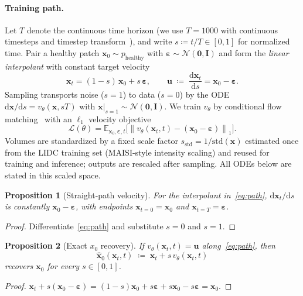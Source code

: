 \documentclass[twoside]{article}
\newtheorem{proposition}{Proposition}
\newcommand{\norm}[1]{\left\|#1\right\|}
\begin{document}
\paragraph{Training path.}
Let \(T\) denote the continuous time horizon (we use \(T{=}1000\) with continuous
timesteps and timestep transform~\cite{esser2024sd3}), and write
\(s\coloneqq t/T\in[0,1]\) for normalized time.
Pair a healthy patch \(\mathbf{x}_0\sim p_{\mathrm{healthy}}\) with
\(\boldsymbol{\varepsilon}\sim\mathcal{N}(\mathbf{0},\mathbf{I})\) and form the
\emph{linear interpolant} with constant target velocity
\begin{equation}
\label{eq:path}
\mathbf{x}_t
=
(1-s)\,\mathbf{x}_0
+
s\,\boldsymbol{\varepsilon},
\qquad
\mathbf{u}
\;\coloneqq\;
\frac{\mathrm{d}\mathbf{x}_t}{\mathrm{d}s}
=
\mathbf{x}_0-\boldsymbol{\varepsilon}.
\end{equation}
Sampling transports noise (\(s{=}1\)) to data (\(s{=}0\)) by the ODE
\(\mathrm{d}\mathbf{x}/\mathrm{d}s=v_\theta(\mathbf{x},sT)\) with
\(\mathbf{x}|_{s=1}\sim\mathcal{N}(\mathbf{0},\mathbf{I})\).
We train \(v_\theta\) by conditional flow matching~\cite{lipman2023flowmatching}
with an \(\ell_1\) velocity objective
\begin{equation}
\label{eq:loss}
\mathcal{L}(\theta)
=
\mathbb{E}_{\mathbf{x}_0,\boldsymbol{\varepsilon},t}
\bigl[
\norm{v_\theta(\mathbf{x}_t,t)-(\mathbf{x}_0-\boldsymbol{\varepsilon})}_1
\bigr].
\end{equation}
Volumes are standardized by a fixed scale factor
\(s_{\mathrm{std}}=1/\mathrm{std}(\mathbf{x})\) estimated once from the
LIDC training set (MAISI-style intensity scaling) and reused for training
and inference; outputs are rescaled after sampling. All ODEs below are
stated in this scaled space.

\begin{proposition}[Straight-path velocity]
\label{prop:velocity}
For the interpolant in~\eqref{eq:path}, \(\mathrm{d}\mathbf{x}_t/\mathrm{d}s\)
is constantly \(\mathbf{x}_0-\boldsymbol{\varepsilon}\), with endpoints
\(\mathbf{x}_{t=0}=\mathbf{x}_0\) and \(\mathbf{x}_{t=T}=\boldsymbol{\varepsilon}\).
\end{proposition}
\begin{proof}
Differentiate~\eqref{eq:path} and substitute \(s{=}0\) and \(s{=}1\).
\end{proof}

\begin{proposition}[Exact \(x_0\) recovery]
\label{prop:x0}
If \(v_\theta(\mathbf{x}_t,t)=\mathbf{u}\) along~\eqref{eq:path}, then
\begin{equation}
\label{eq:x0hat}
\hat{\mathbf{x}}_0(\mathbf{x}_t,t)
\;\coloneqq\;
\mathbf{x}_t + s\,v_\theta(\mathbf{x}_t,t)
\end{equation}
recovers \(\mathbf{x}_0\) for every \(s\in[0,1]\).
\end{proposition}
\begin{proof}
\(\mathbf{x}_t+s(\mathbf{x}_0-\boldsymbol{\varepsilon})
=(1-s)\mathbf{x}_0+s\boldsymbol{\varepsilon}
+s\mathbf{x}_0-s\boldsymbol{\varepsilon}
=\mathbf{x}_0\).
\end{proof}
\end{document}
